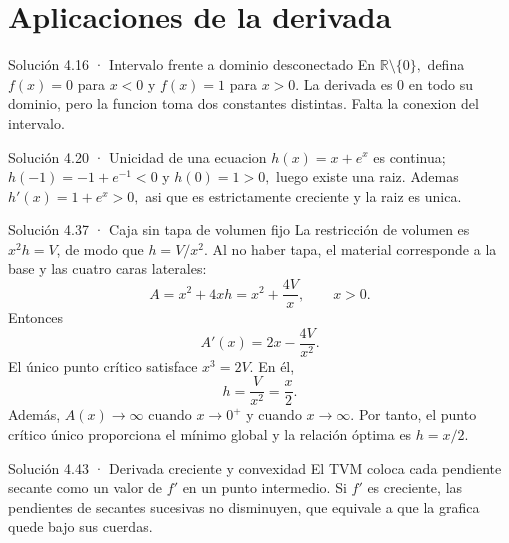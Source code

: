 \documentclass[10pt,a4paper,oneside,openany]{book}
\begin{document}
\chapter{Aplicaciones de la derivada}
\begin{PSevenSolutionFixed}{Solución 4.16 · Intervalo frente a dominio desconectado}
En \(\mathbb{R}\setminus \{0\},\) defina \(f(x)=0\) para \(x<0\) y \(f(x)=1\) para \(x>0\). La derivada es \(0\) en todo su dominio, pero la funcion toma dos constantes distintas. Falta la conexion del intervalo.
\end{PSevenSolutionFixed}
\begin{PSevenSolutionFixed}{Solución 4.20 · Unicidad de una ecuacion}
\(h(x)=x+e^x\) es continua; \(h(-1)=-1+e^{-1}<0\) y \(h(0)=1>0,\) luego existe una raiz. Ademas \(h'(x)=1+e^x>0,\) asi que es estrictamente creciente y la raiz es unica.
\end{PSevenSolutionFixed}
\begin{PSevenSolutionFixed}{Solución 4.37 · Caja sin tapa de volumen fijo}
La restricción de volumen es \(x^2h=V\), de modo que \(h=V/x^2\). Al no haber tapa, el material corresponde a la base y las cuatro caras laterales:
\[
A=x^2+4xh=x^2+\frac{4V}{x},\qquad x>0.
\]
Entonces
\[
A'(x)=2x-\frac{4V}{x^2}.
\]
El único punto crítico satisface \(x^3=2V\). En él,
\[
h=\frac{V}{x^2}=\frac{x}{2}.
\]
Además, \(A(x)\to\infty\) cuando \(x\to0^+\) y cuando \(x\to\infty\). Por tanto, el punto crítico único proporciona el mínimo global y la relación óptima es \(h=x/2\).
\end{PSevenSolutionFixed}
\begin{PSevenSolutionFixed}{Solución 4.43 · Derivada creciente y convexidad}
El TVM coloca cada pendiente secante como un valor de \(f'\) en un punto intermedio. Si \(f'\) es creciente, las pendientes de secantes sucesivas no disminuyen, que equivale a que la grafica quede bajo sus cuerdas.
\end{PSevenSolutionFixed}
\end{document}
